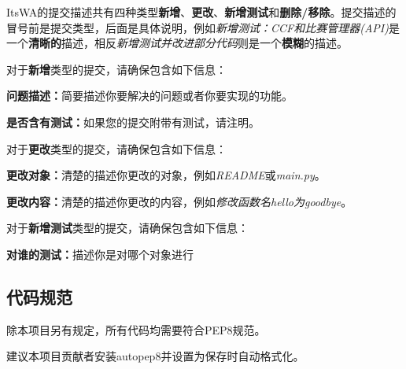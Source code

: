 \documentclass[UTF8]{ctexart}
\newcommand{\itswa}{ItsWA}
\begin{document}
                \itswa 的提交描述共有四种类型\textbf{新增}、\textbf{更改}、\textbf{新增测试}和\textbf{删除/移除}。提交描述的冒号前是提交类型，后面是具体说明，例如\textit{新增测试：CCF和比赛管理器(API)}是一个\textbf{清晰的}描述，相反\textit{新增测试并改进部分代码}则是一个\textbf{模糊}的描述。

                \vspace{0.1cm}
            
                \noindent 对于\textbf{新增}类型的提交，请确保包含如下信息：

                \begin{compactenum}
                    \item \textbf{问题描述：}简要描述你要解决的问题或者你要实现的功能。
                    \item \textbf{是否含有测试：}如果您的提交附带有测试，请注明。
                \end{compactenum}

                \vspace{0.1cm}

                \noindent 对于\textbf{更改}类型的提交，请确保包含如下信息：

                \begin{compactenum}
                    \item \textbf{更改对象：}清楚的描述你更改的对象，例如\textit{README}或\textit{main.py}。
                    \item \textbf{更改内容：}清楚的描述你更改的内容，例如\textit{修改函数名hello为goodbye}。
                \end{compactenum}

                \vspace{0.1cm}

                \noindent 对于\textbf{新增测试}类型的提交，请确保包含如下信息：

                \begin{compactenum}
                    \item \textbf{对谁的测试：}描述你是对哪个对象进行
                \end{compactenum}

        \subsection{代码规范}
            除本项目另有规定，所有代码均需要符合PEP8规范。

            建议本项目贡献者安装autopep8并设置为保存时自动格式化。
\end{document}
